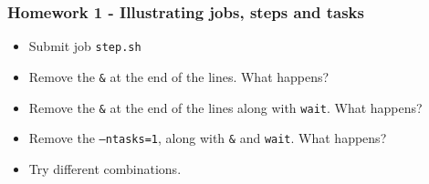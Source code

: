 \documentclass{beamer}
\newcommand{\code}[1]{\colorbox{codegray}{\texttt{#1}}}
\begin{document}
\begin{frame}
\frametitle{Homework 1 - Illustrating jobs, steps and tasks}
\begin{itemize}
    \item Submit job \code{step.sh}
    \bigskip
    \item Remove the \code{\&} at the end of the lines. What happens?
    \bigskip
    \item Remove the \code{\&} at the end of the lines along with \code{wait}. What happens?
    \bigskip
    \item Remove the \code{--ntasks=1}, along with \code{\&} and \code{wait}. What happens?
    \bigskip
    \item Try different combinations.
\end{itemize}
\end{frame}
\end{document}
